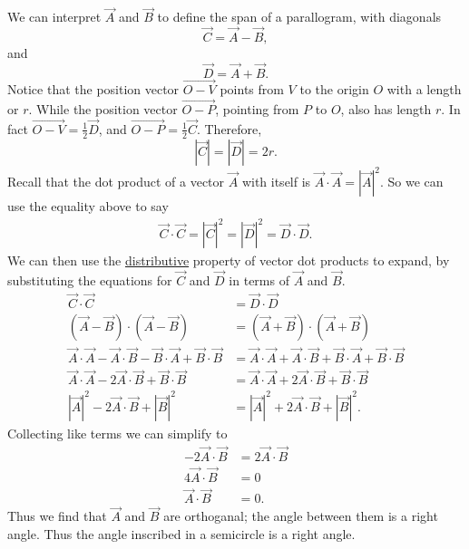 \documentclass[main.tex]{subfiles}
\begin{document}
{We can interpret $\vec{A}$ and $\vec{B}$ to define the span of a parallogram,
with diagonals \[\vec{C} = \vec{A} - \vec{B},\] 
and \[\vec{D} = \vec{A} + \vec{B}.\]
%
Notice that the position vector $\vec{O - V}$ points from $V$ to the origin
$O$ with a length or $r$. While the position vector $\vec{O - P}$, pointing from
$P$ to $O$, also has length $r$. In fact  $\vec{O - V} = \frac{1}{2}\vec{D}$,
and $\vec{O - P} = \frac{1}{2}\vec{C}$. Therefore,
\[|\vec{C}| = |\vec{D}| = 2r.\]
Recall that the dot product of a vector $\vec{A}$ with itself is 
$\vec{A}\cdot\vec{A} = |\vec{A}|^2$. So we can use the equality above to say
\begin{align*}
\vec{C}\cdot\vec{C} = |\vec{C}|^2 = |\vec{D}|^2 = \vec{D}\cdot\vec{D}.
\end{align*}
%
We can then use the \href{\wikidprod}{distributive} property of vector dot products
to expand, by substituting the equations for $\vec{C}$ and $\vec{D}$ in terms
of $\vec{A}$ and $\vec{B}$.
\begin{align*}
\vec{C}\cdot\vec{C} &= \vec{D}\cdot\vec{D}\\
(\vec{A} - \vec{B})\cdot(\vec{A} - \vec{B}) &= (\vec{A} + \vec{B})\cdot(\vec{A} + \vec{B})\\
\vec{A}\cdot\vec{A} - \vec{A}\cdot\vec{B}
-\vec{B}\cdot\vec{A} +\vec{B}\cdot\vec{B} &=
\vec{A}\cdot\vec{A} + \vec{A}\cdot\vec{B}
+\vec{B}\cdot\vec{A} +\vec{B}\cdot\vec{B}\\
\vec{A}\cdot\vec{A} - 2\vec{A}\cdot\vec{B} +\vec{B}\cdot\vec{B} &=
\vec{A}\cdot\vec{A} + 2\vec{A}\cdot\vec{B} +\vec{B}\cdot\vec{B}\\
|\vec{A}|^2 - 2\vec{A}\cdot\vec{B} +|\vec{B}|^2 &=
|\vec{A}|^2 + 2\vec{A}\cdot\vec{B} +|\vec{B}|^2.
\end{align*}
Collecting like terms we can simplify to 
%
\begin{align*}
- 2\vec{A}\cdot\vec{B} &= 2\vec{A}\cdot\vec{B}\\
 4\vec{A}\cdot\vec{B} &= 0\\
 \vec{A}\cdot\vec{B} &= 0.
\end{align*}
%
Thus we find that $\vec{A}$ and $\vec{B}$ are orthoganal; the angle between
them is a right angle. Thus the angle inscribed in a semicircle is a 
right angle.
}
\end{document}
